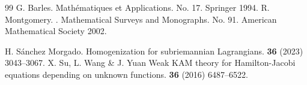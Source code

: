 \documentclass[12pt]{amsart}
\theoremstyle{plain}
\theoremstyle{definition}
\begin{document}
\begin{thebibliography}{99}
   \newblock G. Barles.
  \newblock Math\'ematiques et Applications. No. 17. Springer 1994.
 \newblock R. Montgomery.
  .  
  \newblock  Mathematical Surveys and Monographs. No. 91.
American Mathematical Society 2002.

 \newblock H. S\'anchez Morgado.
  \newblock Homogenization for subriemannian Lagrangians.
    {\bf 36} (2023) 3043--3067.
 \newblock X. Su, L. Wang \& J. Yuan
  \newblock Weak KAM theory for Hamilton-Jacobi equations depending on
  unknown functions.
   {\bf 36} (2016) 6487--6522.
\newblock
\end{thebibliography}
\end{document}
